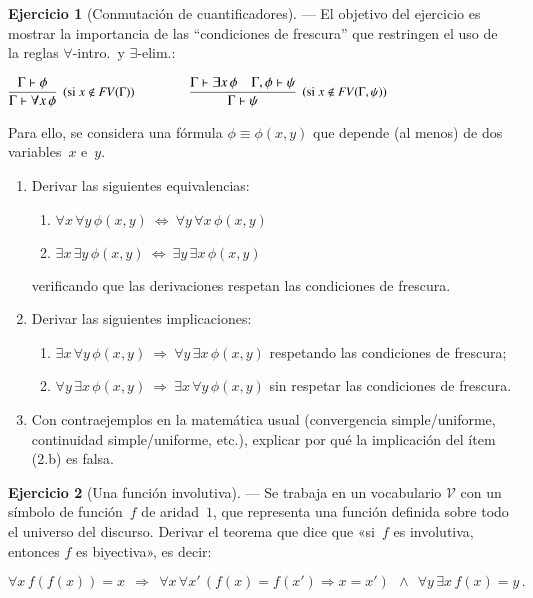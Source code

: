 \documentclass[a4paper,12pt]{book}
\def\limp{\Rightarrow}
\def\liff{\Leftrightarrow}
\def\FV{\mathit{FV}}
\theoremstyle{definition}
\newtheorem{ejercicio}{Ejercicio}
\begin{document}
\bigbreak
\begin{ejercicio}[Conmutación de cuantificadores]
  --- El objetivo del ejercicio es mostrar la importancia de las
  ``condiciones de frescura'' que restringen el uso de la reglas
  $\forall$-intro.\ y $\exists$-elim.:
  \begin{center}
    $\infer[\text{\small(si $x\notin\FV(\Gamma)$)}]
    {\Gamma\vdash\forall x\,\phi}{\Gamma\vdash\phi}\qquad\qquad
    \infer[\text{\small(si $x\notin\FV(\Gamma,\psi)$)}]
    {\Gamma\vdash\psi}
    {\Gamma\vdash\exists x\,\phi & \Gamma,\phi\vdash\psi}$
  \end{center}
  Para ello, se considera una fórmula $\phi\equiv\phi(x,y)$ que
  depende (al menos) de dos variables~$x$ e~$y$.
  \begin{enumerate}\parskip-.5ex
  \item[(1)] Derivar las siguientes equivalencias:
    \begin{enumerate}\parskip-.5ex
    \item[(a)] $\forall x\,\forall y\,\phi(x,y)~\liff~
      \forall y\,\forall x\,\phi(x,y)$
    \item[(b)] $\exists x\,\exists y\,\phi(x,y)~\liff~
      \exists y\,\exists x\,\phi(x,y)$
    \end{enumerate}
    verificando que las derivaciones respetan las condiciones de
    frescura.
  \item[(2)] Derivar las siguientes implicaciones:
    \begin{enumerate}\parskip-.5ex
    \item[(a)] $\exists x\,\forall y\,\phi(x,y)~\limp~
      \forall y\,\exists x\,\phi(x,y)$\quad
      respetando las condiciones de frescura;
    \item[(b)] $\forall y\,\exists x\,\phi(x,y)~\limp~
      \exists x\,\forall y\,\phi(x,y)$\quad
      sin respetar las condiciones de frescura.
    \end{enumerate}
  \item[(3)] Con contraejemplos en la matemática usual
    (convergencia simple/uniforme, continuidad simple/uniforme, etc.),
    explicar por qué la implicación del ítem (2.b) es falsa.
  \end{enumerate}
\end{ejercicio}

\bigbreak
\begin{ejercicio}[Una función involutiva]
  --- Se trabaja en un vocabulario $\mathcal{V}$ con un símbolo de
  función~$f$ de aridad~$1$, que representa una función definida sobre
  todo el universo del discurso.
  Derivar el teorema que dice que «si~$f$ es involutiva, entonces $f$
    es biyectiva», es decir:
  \begin{center}
    $\forall x\,f(f(x))=x~~\limp~~
    \forall x\,\forall x'\,(f(x)=f(x')\limp x=x')~~\land~~
    \forall y\,\exists x\,f(x)=y\,.$
  \end{center}
\end{ejercicio}
\end{document}

